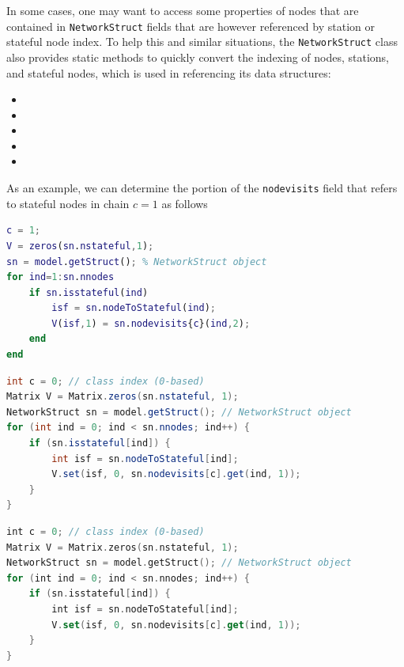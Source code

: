 In some cases, one may want to access some properties of nodes that are contained in \texttt{NetworkStruct} fields that are however referenced by station or stateful node index. To help this and similar situations, the \texttt{NetworkStruct} class also provides static methods to quickly convert the indexing of nodes, stations, and stateful nodes, which is used in referencing its data structures:
\begin{itemize}
\item {}
\item {}
\item {}
\item {}
\item {}
\end{itemize}
As an example, we can determine the portion of the \texttt{nodevisits} field that refers to stateful nodes in chain $c=1$ as follows
\begin{MATLAB}    
\begin{lstlisting}[language = matlab]
c = 1;
V = zeros(sn.nstateful,1);
sn = model.getStruct(); % NetworkStruct object
for ind=1:sn.nnodes
    if sn.isstateful(ind)
        isf = sn.nodeToStateful(ind);
        V(isf,1) = sn.nodevisits{c}(ind,2);
    end
end
\end{lstlisting}
\end{MATLAB}
\begin{JAVA}
\begin{lstlisting}[language=java, basicstyle=\ttfamily\scriptsize]
int c = 0; // class index (0-based)
Matrix V = Matrix.zeros(sn.nstateful, 1);
NetworkStruct sn = model.getStruct(); // NetworkStruct object
for (int ind = 0; ind < sn.nnodes; ind++) {
    if (sn.isstateful[ind]) {
        int isf = sn.nodeToStateful[ind];
        V.set(isf, 0, sn.nodevisits[c].get(ind, 1));
    }
}
\end{lstlisting}
\end{JAVA}
\begin{KOTLIN}
\begin{lstlisting}[language=kotlin, basicstyle=\ttfamily\scriptsize]
int c = 0; // class index (0-based)
Matrix V = Matrix.zeros(sn.nstateful, 1);
NetworkStruct sn = model.getStruct(); // NetworkStruct object
for (int ind = 0; ind < sn.nnodes; ind++) {
    if (sn.isstateful[ind]) {
        int isf = sn.nodeToStateful[ind];
        V.set(isf, 0, sn.nodevisits[c].get(ind, 1));
    }
}
\end{lstlisting}
\end{KOTLIN}
